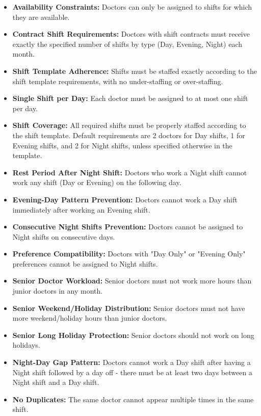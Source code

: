 \documentclass[12pt]{article}
\begin{document}
\begin{itemize}
    \item \textbf{Availability Constraints:} Doctors can only be assigned to shifts for which they are available.

    \item \textbf{Contract Shift Requirements:} Doctors with shift contracts must receive exactly the specified number of shifts by type (Day, Evening, Night) each month.
    
    \item \textbf{Shift Template Adherence:} Shifts must be staffed exactly according to the shift template requirements, with no under-staffing or over-staffing.
    
    \item \textbf{Single Shift per Day:} Each doctor must be assigned to at most one shift per day.
    
    \item \textbf{Shift Coverage:} All required shifts must be properly staffed according to the shift template. Default requirements are 2 doctors for Day shifts, 1 for Evening shifts, and 2 for Night shifts, unless specified otherwise in the template.
    
    \item \textbf{Rest Period After Night Shift:} Doctors who work a Night shift cannot work any shift (Day or Evening) on the following day.
    
    \item \textbf{Evening-Day Pattern Prevention:} Doctors cannot work a Day shift immediately after working an Evening shift.
    
    \item \textbf{Consecutive Night Shifts Prevention:} Doctors cannot be assigned to Night shifts on consecutive days.
    
    \item \textbf{Preference Compatibility:} Doctors with "Day Only" or "Evening Only" preferences cannot be assigned to Night shifts.
    
    \item \textbf{Senior Doctor Workload:} Senior doctors must not work more hours than junior doctors in any month.
    
    \item \textbf{Senior Weekend/Holiday Distribution:} Senior doctors must not have more weekend/holiday hours than junior doctors.
    
    \item \textbf{Senior Long Holiday Protection:} Senior doctors should not work on long holidays.
    
    \item \textbf{Night-Day Gap Pattern:} Doctors cannot work a Day shift after having a Night shift followed by a day off - there must be at least two days between a Night shift and a Day shift.
    
    \item \textbf{No Duplicates:} The same doctor cannot appear multiple times in the same shift.
\end{itemize}
\end{document}
